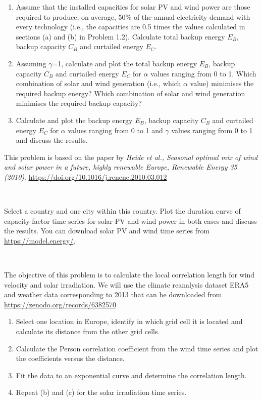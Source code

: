 \documentclass[10pt]{article}
\newenvironment{problem}[2][Problem]{\begin{trivlist}
\item[\hskip \labelsep {\bfseries #1}\hskip \labelsep {\bfseries #2.}]}{\end{trivlist}}
\begin{document}
\begin{enumerate}

\item[a)] Assume that the installed capacities for solar PV and wind power are those required to produce, on average, 50\% of the annual electricity demand with every technology (i.e., the capacities are 0.5 times the values calculated in sections (a) and (b) in Problem 1.2). Calculate total backup energy $E_B$, backup capacity $C_B$ and curtailed energy $E_C$.

\item[b)] Assuming $\gamma$=1, calculate and plot the total backup energy $E_B$, backup capacity $C_B$ and curtailed energy $E_C$ for $\alpha$ values ranging from 0 to 1. Which combination of solar and wind generation (i.e., which $\alpha$ value) minimises the required backup energy? Which combination of solar and wind generation minimises the required backup capacity?

\item[c)] Calculate and plot the backup energy $E_B$, backup capacity $C_B$ and curtailed energy $E_C$ for $\alpha$ values ranging from 0 to 1 and $\gamma$ values ranging from 0 to 1 and discuss the results.

\end{enumerate}
This problem is based on the paper by \textit{Heide et al., Seasonal optimal mix of wind and solar power in a future, highly renewable Europe, Renewable Energy 35 (2010)}. \url{https://doi.org/10.1016/j.renene.2010.03.012}

\

\begin{problem}{1.4}
Select a country and one city within this country. Plot the duration curve of capacity factor time series for solar PV and wind power in both cases and discuss the results. You can download solar PV and wind time series from \url{https://model.energy/}.
\end{problem}

\

\begin{problem}{1.5 (Optional)}

The objective of this problem is to calculate the local correlation length for wind velocity and solar irradiation. We will use the climate reanalysis dataset ERA5 and weather data corresponding to 2013 that can be downloaded from \url{https://zenodo.org/records/6382570}

\begin{enumerate}
\item[a)] Select one location in Europe, identify in which grid cell it is located and calculate its distance from the other grid cells. 
\item[b)] Calculate the Person correlation coefficient from the wind time series and plot the coefficients versus the distance.
\item[c)] Fit the data to an exponential curve and determine the correlation length.
\item[d)] Repeat (b) and (c) for the solar irradiation time series.
\end{enumerate}


\end{problem}

\end{document}
